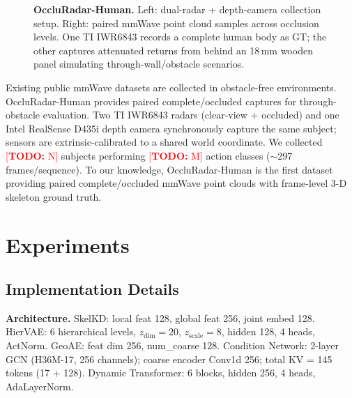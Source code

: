 \documentclass{article}
\newcommand{\todo}[1]{\textcolor{red}{[\textbf{TODO:} #1]}}
\begin{document}
\begin{figure}[t]
  \centering
  \caption{
    \textbf{OccluRadar-Human.}
    Left: dual-radar + depth-camera collection setup.
    Right: paired mmWave point cloud samples across occlusion levels.
    One TI IWR6843 records a complete human body as GT; the other captures
    attenuated returns from behind an 18\,mm wooden panel simulating
    through-wall/obstacle scenarios.
  }
  \label{fig:occludata}
\end{figure}

Existing public mmWave datasets are collected in obstacle-free environments.
OccluRadar-Human provides paired complete/occluded captures for through-obstacle
evaluation.
Two TI IWR6843 radars (clear-view + occluded) and one Intel RealSense D435i
depth camera synchronously capture the same subject; sensors are extrinsic-calibrated
to a shared world coordinate.
We collected \todo{N} subjects performing \todo{M} action classes
($\sim$297 frames/sequence).
To our knowledge, OccluRadar-Human is the first dataset providing paired
complete/occluded mmWave point clouds with frame-level 3-D skeleton ground truth.

\section{Experiments}
\label{sec:exp}

\subsection{Implementation Details}
\label{sec:impl}

\textbf{Architecture.}
SkelKD: local feat 128, global feat 256, joint embed 128.
HierVAE: 6 hierarchical levels, $z_\text{dim}\!=\!20$,
$z_\text{scale}\!=\!8$, hidden 128, 4 heads, ActNorm.
GeoAE: feat dim 256, num\_coarse 128.
Condition Network: 2-layer GCN (H36M-17, 256 channels);
coarse encoder Conv1d 256; total KV = 145 tokens (17 + 128).
Dynamic Transformer: 6 blocks, hidden 256, 4 heads, AdaLayerNorm.
\end{document}
